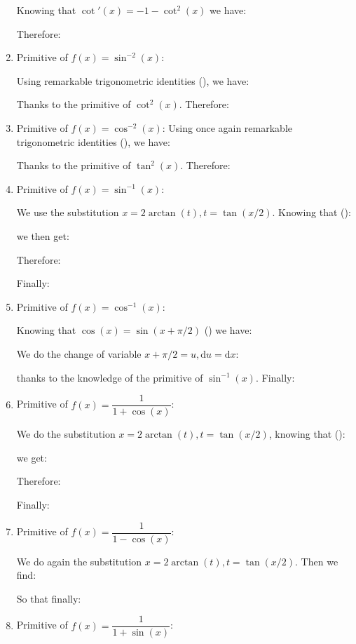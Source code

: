 \begin{enumerate}
		Knowing that $\cot'(x)=-1-\cot^2(x)$ we have:
		
		Therefore:
		
		\item Primitive of $f(x)=\sin ^{-2}(x)$:
		
		Using remarkable trigonometric identities (), we have:
		
		Thanks to the primitive of $\cot^2(x)$. Therefore:
		
		\item Primitive of $f(x)=\cos ^{-2}(x)$:
		Using once again remarkable trigonometric identities (), we have:
		
		Thanks to the primitive of $\tan^2(x)$. Therefore:
		
		\item Primitive of $f(x)=\sin ^{-1}(x)$:
		
		We use the substitution $x=2\arctan(t),t=\tan(x/2)$. Knowing that ():
		
		we then get:
		
		Therefore:
		
		Finally:
		
		\item Primitive of $f(x)=\cos ^{-1}(x)$:
		
		Knowing that $\cos(x)=\sin(x+\pi/2)$ () we have:
		
		We do the change of variable $x+\pi/2=u, \mathrm{d}u=\mathrm{d}x$:
		
		thanks to the knowledge of the primitive of $\sin ^{-1}(x)$. Finally:
		
		\item Primitive of $f(x)=\dfrac{1}{1+\cos(x)}$:
		
		We do the substitution $x=2\arctan(t),t=\tan(x/2)$, knowing that ():
		
		we get:
		
		Therefore:
		
		Finally:
		
		\item  Primitive of $f(x)=\dfrac{1}{1-\cos(x)}$:
		
		We do again the substitution $x=2\arctan(t),t=\tan(x/2)$. Then we find:
		
		So that finally:
		
		\item  Primitive of $f(x)=\dfrac{1}{1+\sin(x)}$:
		

\end{enumerate}
